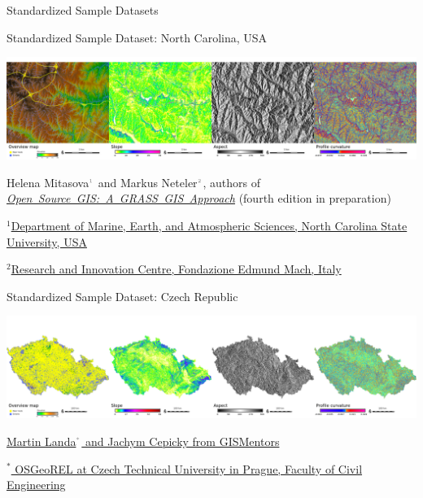 \documentclass[xcolor={dvipsnames,usenames},beamer]{beamer}
\newcommand{\n}[1]{$^{\textcolor{gray}{\mbox{\tiny{#1}}}}$}
\begin{document}
\begin{frame}[fragile]{Standardized Sample Datasets}
\end{frame}



\begin{frame}{Standardized Sample Dataset: North Carolina, USA}

\begin{center}
\includegraphics[width=\textwidth]{./images/dataset/std_dataset_nc_stripe.png}
\end{center}


Helena Mitasova\n{1} and Markus Neteler\n{2}, authors of
\mbox{\href{http://grassbook.org/}{\it Open Source GIS: A GRASS GIS Approach}}
{\scriptsize (fourth edition in preparation)}

\bigskip

{\scriptsize
$^1$\href{http://www.meas.ncsu.edu/}%
{Department of Marine, Earth, and Atmospheric Sciences,
North Carolina State University, USA}

$^2$\href{http://gis.cri.fmach.it/}%
{Research and Innovation Centre, Fondazione Edmund Mach, Italy}
}

\end{frame}

\begin{frame}{Standardized Sample Dataset: Czech Republic}

\begin{center}
\includegraphics[width=\textwidth]{./images/dataset/std_dataset_cz_stripe.png}
\end{center}

\href{http://gismentors.eu/}{Martin Landa\n{*} and Jachym Cepicky from GISMentors}

\bigskip

$^*$\href{http://geomatics.fsv.cvut.cz/research/osgeorel/}%
{\scriptsize
OSGeoREL
at Czech Technical University in Prague,
Faculty of Civil Engineering
}


\note{
\begin{enumerate}
 \item 
\end{enumerate}
}

\end{frame}
\end{document}
